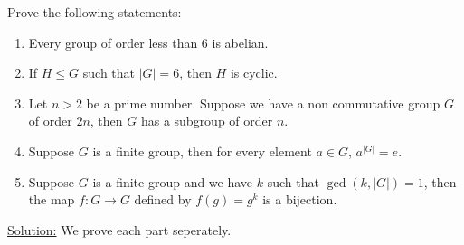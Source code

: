 \documentclass[openany]{book}
\begin{document}
\begin{exercise}
    Prove the following statements:
    \begin{enumerate}
        \item Every group of order less than 6 is abelian.
        \item If $H \leq G$ such that $|G| = 6$, then $H$ is cyclic. 
        \item Let $n > 2$ be a prime number. Suppose we have a non commutative group $G$ of order $2n$, then $G$ has a subgroup of order $n$.
        \item Suppose $G$ is a finite group, then for every element $a \in G$, $a^{|G|} = e$.
        \item Suppose $G$ is a finite group and we have $k$ such that $\gcd(k, |G|) = 1$, then the map $f: G \to G$ defined by $f(g) = g^k$ is a bijection.
    \end{enumerate}
\end{exercise}
\underline{Solution:} We prove each part seperately. 
\end{document}
